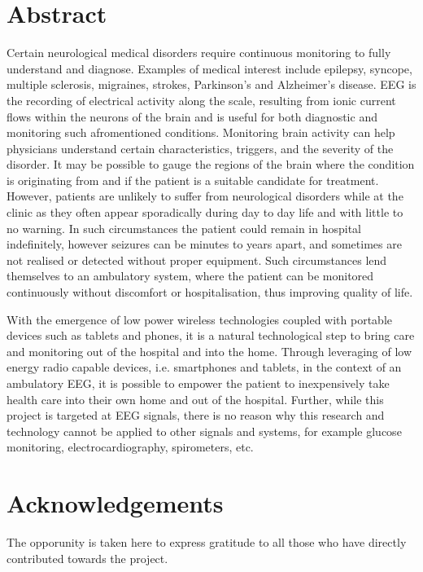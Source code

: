 \documentclass[]{article}
\begin{document}
\section*{Abstract}
Certain neurological medical disorders require continuous monitoring to fully understand and diagnose. Examples of medical interest include epilepsy, syncope, multiple sclerosis, migraines, strokes, Parkinson’s and Alzheimer’s disease. \ac{EEG} is the recording of electrical activity along the scale, resulting from ionic current flows within the neurons of the brain and is useful for both diagnostic and monitoring such afromentioned conditions. Monitoring brain activity can help physicians understand certain characteristics, triggers, and the severity of the disorder. It may be possible to gauge the regions of the brain where the condition is originating from and if the patient is a suitable candidate for treatment. 
However, patients are unlikely to suffer from neurological disorders while at the clinic as they often appear sporadically during day to day life and with little to no warning. In such circumstances the patient could remain in hospital indefinitely, however seizures can be minutes to years apart, and sometimes are not realised or detected without proper equipment. Such circumstances lend themselves to an ambulatory system, where the patient can be monitored continuously without discomfort or hospitalisation, thus improving quality of life. 

With the emergence of low power wireless technologies coupled with portable devices such as tablets and phones, it is a natural technological step to bring care and monitoring out of the hospital and into the home. Through leveraging of low energy radio capable devices, i.e. smartphones and tablets, in the context of an ambulatory EEG, it is possible to empower the patient to inexpensively take health care into their own home and out of the hospital. Further, while this project is targeted at EEG signals, there is no reason why this research and technology cannot be applied to other signals and systems, for example glucose monitoring, electrocardiography, spirometers, etc.
\cite{Blanco95}
\clearpage
\tableofcontents
\clearpage

\section{Acknowledgements}
The opporunity is taken here to express gratitude to all those who have directly contributed towards the project. 
\end{document}
